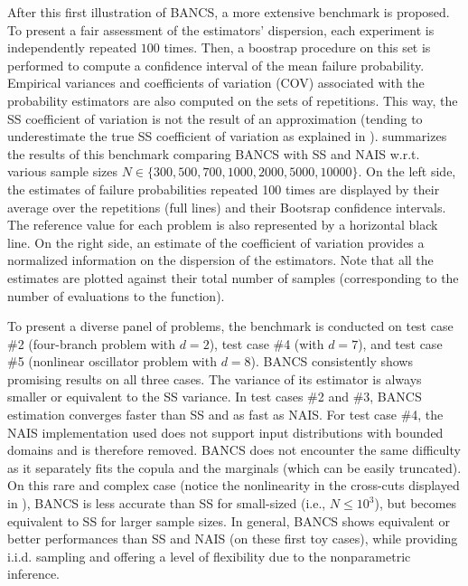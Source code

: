 After this first illustration of BANCS, a more extensive benchmark is proposed. 
To present a fair assessment of the estimators' dispersion, each experiment is independently repeated $100$ times. 
Then, a boostrap procedure on this set is performed to compute a confidence interval of the mean failure probability. 
Empirical variances and coefficients of variation (COV) associated with the probability estimators are also computed on the sets of repetitions. 
This way, the SS coefficient of variation is not the result of an approximation (tending to underestimate the true SS coefficient of variation as explained in \citealp{Papaioannou_PEM_2015}).
 summarizes the results of this benchmark comparing BANCS with SS and NAIS w.r.t. various sample sizes $N \in \{300, 500, 700, 1000, 2000, 5000, 10000\}$.  
On the left side, the estimates of failure probabilities repeated 100 times are displayed by their average over the repetitions (full lines) and their Bootsrap confidence intervals. 
The reference value for each problem is also represented by a horizontal black line. 
On the right side, an estimate of the coefficient of variation provides a normalized information on the dispersion of the estimators.  
Note that all the estimates are plotted against their total number of samples (corresponding to the number of evaluations to the function). 

To present a diverse panel of problems, the benchmark is conducted on test case \#2 (four-branch problem with $d=2$), test case \#4 (with $d=7$), and test case \#5 (nonlinear oscillator problem with $d=8$). 
BANCS consistently shows promising results on all three cases. 
The variance of its estimator is always smaller or equivalent to the SS variance. 
In test cases \#2 and \#3, BANCS estimation converges faster than SS and as fast as NAIS. 
For test case \#4, the NAIS implementation used does not support input distributions with bounded domains and is therefore removed. 
BANCS does not encounter the same difficulty as it separately fits the copula and the marginals (which can be easily truncated). 
On this rare and complex case (notice the nonlinearity in the cross-cuts displayed in ), BANCS is less accurate than SS for small-sized (i.e., $N\leq 10^3$), but becomes equivalent to SS for larger sample sizes.
In general, BANCS shows equivalent or better performances than SS and NAIS (on these first toy cases), while providing i.i.d. sampling and offering a level of flexibility due to the nonparametric inference. 

